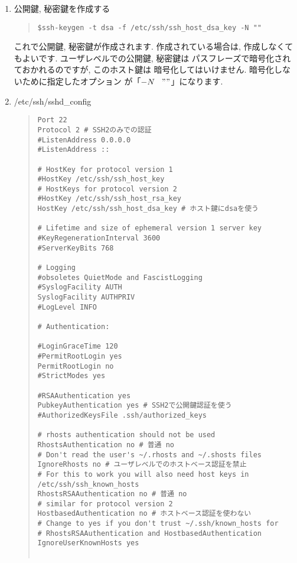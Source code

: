 \documentclass[a4paper,titlepage]{jreport}
\begin{document}
\begin{enumerate}
\item 公開鍵, 秘密鍵を作成する

\begin{quote}
\begin{screen}
\begin{verbatim}
$ssh-keygen -t dsa -f /etc/ssh/ssh_host_dsa_key -N ""
\end{verbatim}
\end{screen}
\end{quote}

      これで公開鍵, 秘密鍵が作成されます. 作成されている場合は,
      作成しなくてもよいです. ユーザレベルでの公開鍵, 秘密鍵は
      パスフレーズで暗号化されておかれるのですが, このホスト鍵は
      暗号化してはいけません. 暗号化しないために指定したオプション
      が「$-N\hspace{3mm} ""$」になります.

\item /etc/ssh/sshd\_config

\begin{quote}
\begin{screen}
\begin{verbatim}
Port 22
Protocol 2 # SSH2のみでの認証
#ListenAddress 0.0.0.0
#ListenAddress ::

# HostKey for protocol version 1
#HostKey /etc/ssh/ssh_host_key
# HostKeys for protocol version 2
#HostKey /etc/ssh/ssh_host_rsa_key
HostKey /etc/ssh/ssh_host_dsa_key # ホスト鍵にdsaを使う

# Lifetime and size of ephemeral version 1 server key
#KeyRegenerationInterval 3600
#ServerKeyBits 768

# Logging
#obsoletes QuietMode and FascistLogging
#SyslogFacility AUTH
SyslogFacility AUTHPRIV
#LogLevel INFO

# Authentication:

#LoginGraceTime 120
#PermitRootLogin yes
PermitRootLogin no
#StrictModes yes

#RSAAuthentication yes 
PubkeyAuthentication yes # SSH2で公開鍵認証を使う
#AuthorizedKeysFile	.ssh/authorized_keys

# rhosts authentication should not be used
RhostsAuthentication no # 普通 no
# Don't read the user's ~/.rhosts and ~/.shosts files
IgnoreRhosts no # ユーザレベルでのホストベース認証を禁止
# For this to work you will also need host keys in /etc/ssh/ssh_known_hosts
RhostsRSAAuthentication no # 普通 no
# similar for protocol version 2
HostbasedAuthentication no # ホストベース認証を使わない
# Change to yes if you don't trust ~/.ssh/known_hosts for
# RhostsRSAAuthentication and HostbasedAuthentication
IgnoreUserKnownHosts yes


\end{verbatim}
\end{screen}
\end{quote}
\end{enumerate}
\end{document}
